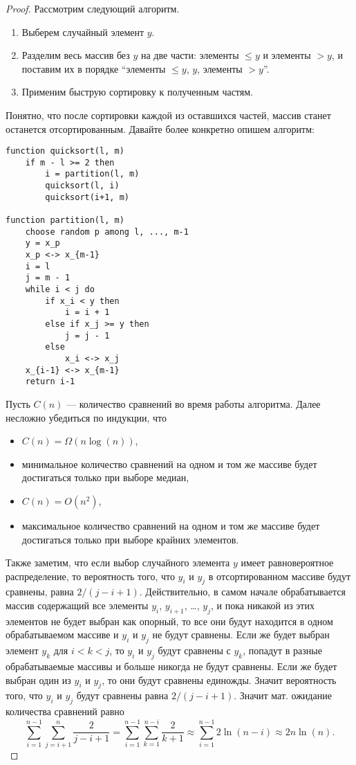\documentclass[12pt,a4paper]{article}
\begin{document}
    \begin{proof}
        Рассмотрим следующий алгоритм.
        \begin{enumerate}
            \item Выберем случайный элемент $y$.
            \item Разделим весь массив без $y$ на две части: элементы $\leqslant y$ и элементы $> y$, и поставим их в порядке ``элементы $\leqslant y$, $y$, элементы $> y$''.
            \item Применим быструю сортировку к полученным частям.
        \end{enumerate}
        Понятно, что после сортировки каждой из оставшихся частей, массив станет останется отсортированным. Давайте более конкретно опишем алгоритм:
        \begin{verbatim}
function quicksort(l, m)
    if m - l >= 2 then
        i = partition(l, m)
        quicksort(l, i)
        quicksort(i+1, m)

function partition(l, m)
    choose random p among l, ..., m-1
    y = x_p
    x_p <-> x_{m-1}
    i = l
    j = m - 1
    while i < j do
        if x_i < y then
            i = i + 1
        else if x_j >= y then
            j = j - 1
        else
            x_i <-> x_j
    x_{i-1} <-> x_{m-1}
    return i-1
        \end{verbatim}

        Пусть $C(n)$ --- количество сравнений во время работы алгоритма. Далее несложно убедиться по индукции, что
        \begin{itemize}
            \item $C(n) = \Omega(n \log(n))$,
            \item минимальное количество сравнений на одном и том же массиве будет достигаться только при выборе медиан,
            \item $C(n) = O(n^2)$,
            \item максимальное количество сравнений на одном и том же массиве будет достигаться только при выборе крайних элементов.
        \end{itemize}

        Также заметим, что если выбор случайного элемента $y$ имеет равновероятное распределение, то вероятность того, что $y_i$ и $y_j$ в отсортированном массиве будут сравнены, равна $2/(j-i+1)$. Действительно, в самом начале обрабатывается массив содержащий все элементы $y_i$, $y_{i+1}$, \dots, $y_j$, и пока никакой из этих элементов не будет выбран как опорный, то все они будут находится в одном обрабатываемом массиве и $y_i$ и $y_j$ не будут сравнены. Если же будет выбран элемент $y_k$ для $i < k < j$, то $y_i$ и $y_j$ будут сравнены с $y_k$, попадут в разные обрабатываемые массивы и больше никогда не будут сравнены. Если же будет выбран один из $y_i$ и $y_j$, то они будут сравнены единожды. Значит вероятность того, что $y_i$ и $y_j$ будут сравнены равна $2/(j-i+1)$. Значит мат. ожидание количества сравнений равно
        \[
            \sum_{i=1}^{n-1} \sum_{j=i+1}^n \frac{2}{j-i+1}
            = \sum_{i=1}^{n-1} \sum_{k=1}^{n-i} \frac{2}{k+1}
            \approx \sum_{i=1}^{n-1} 2\ln(n-i)
            \approx 2n \ln(n).
        \]

        
    \end{proof}
\end{document}
